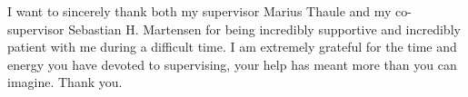 I want to sincerely thank both my supervisor Marius Thaule and my co-supervisor Sebastian H. Martensen for being incredibly supportive and incredibly patient with me during a difficult time. I am extremely grateful for the time and energy you have devoted to supervising, your help has meant more than you can imagine. Thank you.